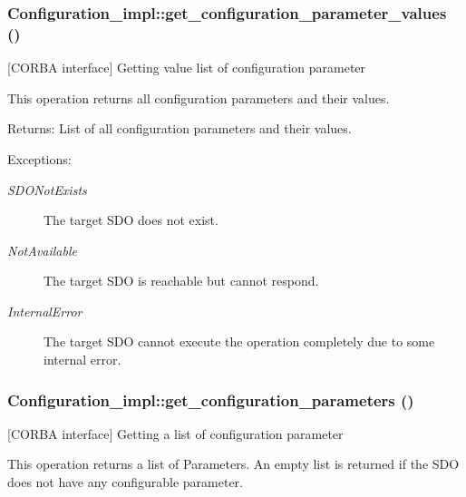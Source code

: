 \subsubsection{\setlength{\rightskip}{0pt plus 5cm}Configuration\_\-impl::get\_\-configuration\_\-parameter\_\-values ()}\label{classConfiguration__impl_Configuration__impla7}


[CORBA interface] Getting value list of configuration parameter 

This operation returns all configuration parameters and their values.

\begin{Desc}
\item[Returns:]List of all configuration parameters and their values. \end{Desc}
\begin{Desc}
\item[Exceptions:]
\begin{description}
\item[{\em SDONot\-Exists}]The target SDO does not exist. \item[{\em Not\-Available}]The target SDO is reachable but cannot respond. \item[{\em Internal\-Error}]The target SDO cannot execute the operation completely due to some internal error.\end{description}
\end{Desc}
\subsubsection{\setlength{\rightskip}{0pt plus 5cm}Configuration\_\-impl::get\_\-configuration\_\-parameters ()}\label{classConfiguration__impl_Configuration__impla6}


[CORBA interface] Getting a list of configuration parameter 

This operation returns a list of Parameters. An empty list is returned if the SDO does not have any configurable parameter.

